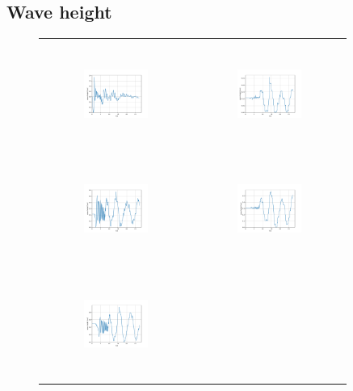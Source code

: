 \subsection{Wave height}

\begin{figure}[H]
\begin{center}
\begin{tabular}{cc}
\includegraphics[width=0.45\textwidth, height=3.5cm]{graph/omega=0.50_A=1_wave.pdf}
&
\includegraphics[width=0.45\textwidth, height=3.5cm]{graph/omega=0.50_A=2_wave.pdf}\\
\includegraphics[width=0.45\textwidth, height=3.5cm]{graph/omega=0.50_A=3_wave.pdf}
&
\includegraphics[width=0.45\textwidth, height=3.5cm]{graph/omega=0.50_A=4_wave.pdf}\\
\includegraphics[width=0.45\textwidth, height=3.5cm]{graph/omega=0.50_A=5_wave.pdf}

\end{tabular}
\end{center}
\end{figure}
